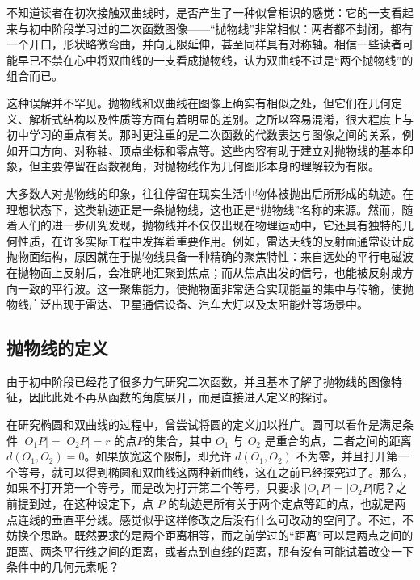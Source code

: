 

不知道读者在初次接触双曲线时，是否产生了一种似曾相识的感觉：它的一支看起来与初中阶段学习过的二次函数图像——“抛物线”非常相似：两者都不封闭，都有一个开口，形状略微弯曲，并向无限延伸，甚至同样具有对称轴。相信一些读者可能早已不禁在心中将双曲线的一支看成抛物线，认为双曲线不过是“两个抛物线”的组合而已。

这种误解并不罕见。抛物线和双曲线在图像上确实有相似之处，但它们在几何定义、解析式结构以及性质等方面有着明显的差别。之所以容易混淆，很大程度上与初中学习的重点有关。那时更注重的是二次函数的代数表达与图像之间的关系，例如开口方向、对称轴、顶点坐标和零点等。这些内容有助于建立对抛物线的基本印象，但主要停留在函数视角，对抛物线作为几何图形本身的理解较为有限。

大多数人对抛物线的印象，往往停留在现实生活中物体被抛出后所形成的轨迹。在理想状态下，这类轨迹正是一条抛物线，这也正是“抛物线”名称的来源。然而，随着人们的进一步研究发现，抛物线并不仅仅出现在物理运动中，它还具有独特的几何性质，在许多实际工程中发挥着重要作用。例如，雷达天线的反射面通常设计成抛物面结构，原因就在于抛物线具备一种精确的聚焦特性：来自远处的平行电磁波在抛物面上反射后，会准确地汇聚到焦点；而从焦点出发的信号，也能被反射成方向一致的平行波。这一聚焦能力，使抛物面非常适合实现能量的集中与传输，使抛物线广泛出现于雷达、卫星通信设备、汽车大灯以及太阳能灶等场景中。

\subsection{抛物线的定义}

由于初中阶段已经花了很多力气研究二次函数，并且基本了解了抛物线的图像特征，因此此处不再从函数的角度展开，而是直接进入定义的探讨。

在研究椭圆和双曲线的过程中，曾尝试将圆的定义加以推广。圆可以看作是满足条件 $|O_1P| = |O_2P| = r$ 的点$P$的集合，其中 $O_1$ 与 $O_2$ 是重合的点，二者之间的距离 $d(O_1,O_2)=0$。如果放宽这个限制，即允许 $d(O_1,O_2)$ 不为零，并且打开第一个等号，就可以得到椭圆和双曲线这两种新曲线，这在之前已经探究过了。那么，如果不打开第一个等号，而是改为打开第二个等号，只要求 $|O_1P| = |O_2P|$呢？之前提到过，在这种设定下，点 $P$ 的轨迹是所有关于两个定点等距的点，也就是两点连线的垂直平分线。感觉似乎这样修改之后没有什么可改动的空间了。不过，不妨换个思路。既然要求的是两个距离相等，而之前学过的“距离”可以是两点之间的距离、两条平行线之间的距离，或者点到直线的距离，那有没有可能试着改变一下条件中的几何元素呢？

